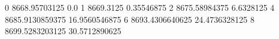 0 8668.95703125 0.0
1 8669.3125 0.35546875
2 8675.58984375 6.6328125
4 8685.9130859375 16.9560546875
6 8693.4306640625 24.4736328125
8 8699.5283203125 30.5712890625
